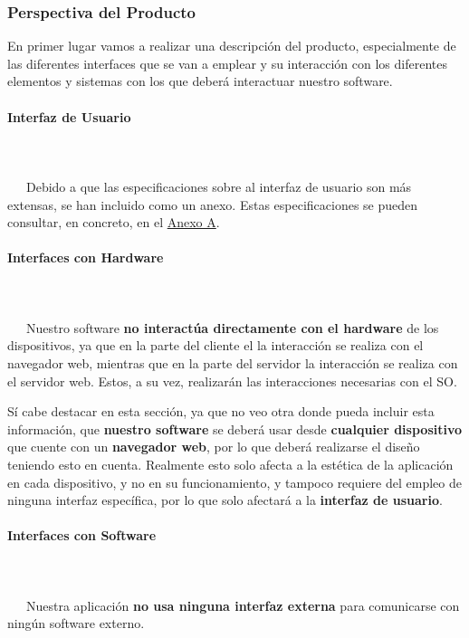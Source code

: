 \subsubsection{Perspectiva del Producto}
En primer lugar vamos a realizar una descripción del producto, especialmente de las diferentes interfaces que se van a emplear y su interacción con los diferentes elementos y sistemas con los que deberá interactuar nuestro software.

\paragraph{Interfaz de Usuario}
~\\\\
\-\ \-\ \-\ Debido a que las especificaciones sobre al interfaz de usuario son más extensas, se han incluido como un anexo. Estas especificaciones se pueden consultar, en concreto, en el \hyperref[sec:apenA]{Anexo A}.


\paragraph{Interfaces con Hardware}
~\\\\
\-\ \-\ \-\ Nuestro software \textbf{no interactúa directamente con el hardware} de los dispositivos, ya que en la parte del cliente el la interacción se realiza con el navegador web, mientras que en la parte del servidor la interacción se realiza con el servidor web. Estos, a su vez, realizarán las interacciones necesarias con el SO.

Sí cabe destacar en esta sección, ya que no veo otra donde pueda incluir esta información, que \textbf{nuestro software} se deberá usar desde \textbf{cualquier dispositivo} que cuente con un \textbf{navegador web}, por lo que deberá realizarse el diseño teniendo esto en cuenta. Realmente esto solo afecta a la estética de la aplicación en cada dispositivo, y no en su funcionamiento, y tampoco requiere del empleo de ninguna interfaz específica, por lo que solo afectará a la \textbf{interfaz de usuario}. 


\paragraph{Interfaces con Software}
~\\\\
\-\ \-\ \-\ Nuestra aplicación \textbf{no usa ninguna interfaz externa} para comunicarse con ningún software externo. 

